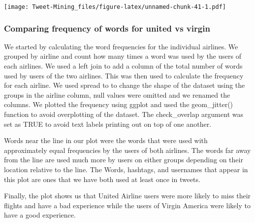 \documentclass[
]{article}
\newenvironment{Shaded}{\begin{snugshade}}{\end{snugshade}}
\newcommand{\CommentTok}[1]{\textcolor[rgb]{0.56,0.35,0.01}{\textit{#1}}}
\newcommand{\DataTypeTok}[1]{\textcolor[rgb]{0.13,0.29,0.53}{#1}}
\newcommand{\KeywordTok}[1]{\textcolor[rgb]{0.13,0.29,0.53}{\textbf{#1}}}
\newcommand{\NormalTok}[1]{#1}
\newcommand{\OperatorTok}[1]{\textcolor[rgb]{0.81,0.36,0.00}{\textbf{#1}}}
\newcommand{\OtherTok}[1]{\textcolor[rgb]{0.56,0.35,0.01}{#1}}
\newcommand{\StringTok}[1]{\textcolor[rgb]{0.31,0.60,0.02}{#1}}
\begin{document}
\texttt{[image: Tweet-Mining\_files/figure-latex/unnamed-chunk-41-1.pdf]}

\hypertarget{comparing-frequency-of-words-for-united-vs-virgin}{%
\subsubsection{Comparing frequency of words for united vs
virgin}\label{comparing-frequency-of-words-for-united-vs-virgin}}

We started by calculating the word frequencies for the individual
airlines. We grouped by airline and count how many times a word was used
by the users of each airlines. We used a left join to add a column of
the total number of words used by users of the two airlines. This was
then used to calculate the frequency for each airline. We used spread to
to change the shape of the dataset using the groups in the airline
column, null values were omitted and we renamed the columns. We plotted
the frequency using ggplot and used the geom\_jitter() function to avoid
overplotting of the dataset. The check\_overlap argument was set as TRUE
to avoid text labels printing out on top of one another.

Words near the line in our plot were the words that were used with
approximately equal frequencies by the users of both airlines. The words
far away from the line are used much more by users on either groups
depending on their location relative to the line. The Words, hashtags,
and usernames that appear in this plot are ones that we have both used
at least once in tweets.

Finally, the plot shows us that United Airline users were more likely to
miss their flights and have a bad experience while the users of Virgin
America were likely to have a good experience.

\begin{Shaded}
\end{Shaded}
\end{document}
